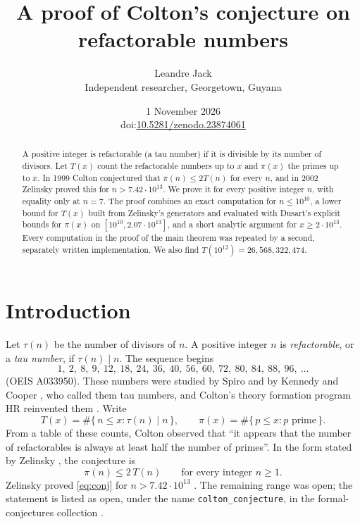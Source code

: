 \documentclass[11pt]{article}
\title{A proof of Colton's conjecture on refactorable numbers}
\author{Leandre Jack\\[2pt] \small Independent researcher, Georgetown, Guyana}
\date{1 November 2026\\[2pt] \small doi:\href{https://doi.org/10.5281/zenodo.23874061}{10.5281/zenodo.23874061}}
\theoremstyle{remark}
\begin{document}
\maketitle

\begin{abstract}
A positive integer is refactorable (a tau number) if it is divisible by its number of divisors. Let $T(x)$ count the refactorable numbers up to $x$ and $\pi(x)$ the primes up to $x$. In 1999 Colton conjectured that $\pi(n) \le 2T(n)$ for every $n$, and in 2002 Zelinsky proved this for $n > 7.42\cdot 10^{13}$. We prove it for every positive integer $n$, with equality only at $n = 7$. The proof combines an exact computation for $n \le 10^{10}$, a lower bound for $T(x)$ built from Zelinsky's generators and evaluated with Dusart's explicit bounds for $\pi(x)$ on $[10^{10}, 2.07\cdot 10^{13}]$, and a short analytic argument for $x \ge 2\cdot 10^{13}$. Every computation in the proof of the main theorem was repeated by a second, separately written implementation. We also find $T(10^{12}) = 26{,}568{,}322{,}474$.
\end{abstract}

\section{Introduction}

Let $\tau(n)$ be the number of divisors of $n$. A positive integer $n$ is \emph{refactorable}, or a \emph{tau number}, if $\tau(n) \mid n$. The sequence begins
\[
1,\ 2,\ 8,\ 9,\ 12,\ 18,\ 24,\ 36,\ 40,\ 56,\ 60,\ 72,\ 80,\ 84,\ 88,\ 96,\ \dots
\]
(OEIS A033950). These numbers were studied by Spiro \cite{Sp} and by Kennedy and Cooper \cite{KC}, who called them tau numbers, and Colton's theory formation program HR reinvented them \cite{Co}. Write
\[
T(x) = \#\{\, n \le x : \tau(n) \mid n \,\}, \qquad \pi(x) = \#\{\, p \le x : p \text{ prime} \,\}.
\]
From a table of these counts, Colton observed \cite[Section~2.3]{Co} that ``it appears that the number of refactorables is always at least half the number of primes''. In the form stated by Zelinsky \cite{Ze}, the conjecture is
\begin{equation}\label{eq:conj}
\pi(n) \le 2\,T(n) \qquad \text{for every integer } n \ge 1.
\end{equation}
Zelinsky proved \eqref{eq:conj} for $n > 7.42\cdot 10^{13}$ \cite[Theorem~22]{Ze}. The remaining range was open; the statement is listed as open, under the name \texttt{colton\_conjecture}, in the formal-conjectures collection \cite{FC}.
\end{document}
